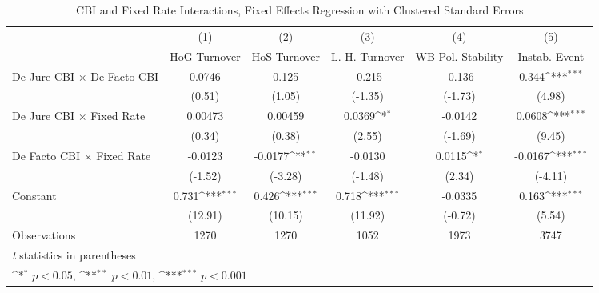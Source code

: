 \begin{table}[htbp]\centering
\def\sym#1{\ifmmode^{#1}\else\(^{#1}\)\fi}
\caption{CBI and Fixed Rate Interactions, Fixed Effects Regression with Clustered Standard Errors \label{imultIndFE}}
\begin{tabular}{l*{5}{c}}
\toprule
                                        &\multicolumn{1}{c}{(1)}&\multicolumn{1}{c}{(2)}&\multicolumn{1}{c}{(3)}&\multicolumn{1}{c}{(4)}&\multicolumn{1}{c}{(5)}\\
                                        &\multicolumn{1}{c}{HoG Turnover}&\multicolumn{1}{c}{HoS Turnover}&\multicolumn{1}{c}{L. H. Turnover}&\multicolumn{1}{c}{WB Pol. Stability}&\multicolumn{1}{c}{Instab. Event}\\
\midrule
De Jure CBI $\times$ De Facto CBI       &   0.0746         &    0.125         &   -0.215         &   -0.136         &    0.344\sym{***}\\
                                        &   (0.51)         &   (1.05)         &  (-1.35)         &  (-1.73)         &   (4.98)         \\
\addlinespace
De Jure CBI $\times$ Fixed Rate         &  0.00473         &  0.00459         &   0.0369\sym{*}  &  -0.0142         &   0.0608\sym{***}\\
                                        &   (0.34)         &   (0.38)         &   (2.55)         &  (-1.69)         &   (9.45)         \\
\addlinespace
De Facto CBI $\times$ Fixed Rate        &  -0.0123         &  -0.0177\sym{**} &  -0.0130         &   0.0115\sym{*}  &  -0.0167\sym{***}\\
                                        &  (-1.52)         &  (-3.28)         &  (-1.48)         &   (2.34)         &  (-4.11)         \\
\addlinespace
Constant                                &    0.731\sym{***}&    0.426\sym{***}&    0.718\sym{***}&  -0.0335         &    0.163\sym{***}\\
                                        &  (12.91)         &  (10.15)         &  (11.92)         &  (-0.72)         &   (5.54)         \\
\midrule
Observations                            &     1270         &     1270         &     1052         &     1973         &     3747         \\
\bottomrule
\multicolumn{6}{l}{\footnotesize \textit{t} statistics in parentheses}\\
\multicolumn{6}{l}{\footnotesize \sym{*} \(p<0.05\), \sym{**} \(p<0.01\), \sym{***} \(p<0.001\)}\\
\end{tabular}
\end{table}
